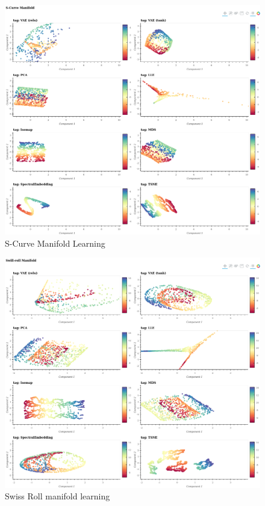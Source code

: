 \documentclass[12pt]{article}
\begin{document}
\begin{figure}[!htb]
    \includegraphics[scale =0.3]{../../media/03-scurve-latent.png}
    \caption{S-Curve Manifold Learning}
    \label{fig:scurve}
\end{figure}


\begin{figure}[!hb]
\includegraphics[scale = 0.3]{../../media/03-swissroll-latent.png}
    \caption{Swiss Roll manifold learning}
    \label{fig:swissroll}
\end{figure}
\end{document}

